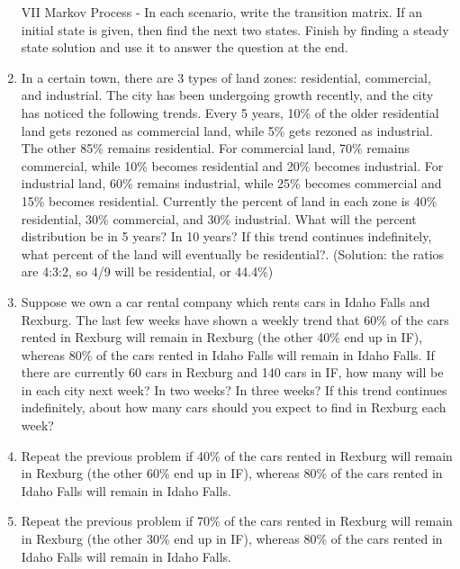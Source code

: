 \documentclass[10pt]{amsart}
\begin{document}
\begin{multicols}{2}
\begin{enumerate}
\vspace{.3in}
\item[VII] Markov Process - In each scenario, write the transition matrix. If an initial state is given, then find the next two states. Finish by finding a steady state solution and use it to answer the question at the end.

\item In a certain town, there are 3 types of land zones: residential, commercial, and industrial. The city has been undergoing growth recently, and the city has noticed the following trends.  Every 5 years, 10\% of the older residential land gets rezoned as commercial land, while 5\% gets rezoned as industrial.  The other 85\% remains residential.  For commercial land, 70\% remains commercial, while 10\% becomes residential and 20\% becomes industrial. For industrial land, 60\% remains industrial, while 25\% becomes commercial and 15\% becomes residential. Currently the percent of land in each zone is 40\% residential, 30\% commercial, and 30\% industrial. What will the percent distribution be in 5 years? In 10 years?  If this trend continues indefinitely, what percent of the land will eventually be residential?. (Solution: the ratios are 4:3:2, so 4/9 will be residential, or 44.4\%)
\item Suppose we own a car rental company which rents cars in Idaho Falls and Rexburg. The last few weeks have shown a weekly trend that 60\% of the cars rented in Rexburg will remain in Rexburg (the other 40\% end up in IF), whereas 80\% of the cars rented in Idaho Falls will remain in Idaho Falls. If there are currently 60 cars in Rexburg and 140 cars in IF, how many will be in each city next week?  In two weeks? In three weeks? If this trend continues indefinitely, about how many cars should you expect to find in Rexburg each week?
\item Repeat the previous problem if 40\% of the cars rented in Rexburg will remain in Rexburg (the other 60\% end up in IF), whereas 80\% of the cars rented in Idaho Falls will remain in Idaho Falls.
\item Repeat the previous problem if 70\% of the cars rented in Rexburg will remain in Rexburg (the other 30\% end up in IF), whereas 80\% of the cars rented in Idaho Falls will remain in Idaho Falls.

\end{enumerate}
\end{multicols}
\end{document}
